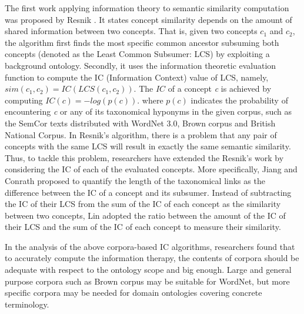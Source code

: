 The first work applying information theory to semantic similarity
computation was proposed by Resnik \cite{Resnik:1995}. It states concept
similarity depends on the amount of shared information
between two concepts. That is, given two concepts $c_1$ and $c_2$, the algorithm first finds the most specific common ancestor subsuming both concepts (denoted as the Least Common Subsumer: LCS) by exploiting a background ontology. Secondly, it uses the information theoretic evaluation function to compute the IC (Information Context) value of LCS, namely,
$sim(c_1, c_2) = IC(LCS(c_1, c_2))$.
The $IC$ of a concept \emph{c} is achieved by computing $IC(c) = -log(p(c))$.
where $p(c)$ indicates the probability of encountering \emph{c} or any of its taxonomical hyponyms in the given corpus, such as the SemCor texts distributed with WordNet 3.0, Brown corpus and British National Corpus. In Resnik's algorithm, there is a problem that any pair of concepts with the same LCS will result in exactly the same semantic similarity. Thus, to tackle this problem, researchers have extended the Resnik's work by considering the IC of each of the evaluated concepts. More specifically, Jiang and Conrath proposed to quantify the length of the taxonomical links as the difference between the IC of a concept and its subsumer\cite{Jiang:1997}. Instead of subtracting the IC of their LCS from the sum of the
IC of each concept as the similarity between two concepts, Lin adopted the ratio between the amount of the IC of their LCS and the sum of the IC of each concept to measure their similarity.

In the analysis of the above corpora-based IC algorithms, researchers found that to accurately compute the information therapy, the contents of corpora should be adequate with respect
to the ontology scope and big enough.
Large and general purpose corpora such as Brown corpus may be suitable for WordNet, but more specific corpora may be
needed for domain ontologies covering concrete terminology.

